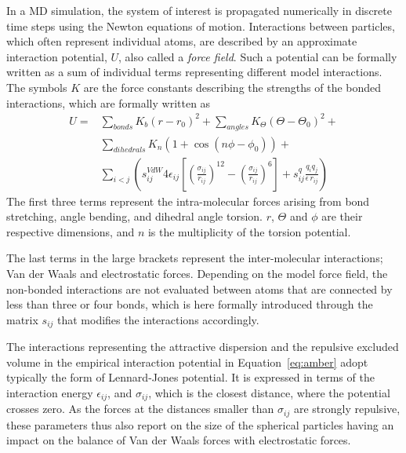 In a MD simulation, the system of interest is propagated numerically in discrete time steps using
the Newton equations of motion. 
Interactions between particles, which often represent individual atoms, 
are described by an approximate interaction potential, $U$, also called a \emph{force field}. 
Such a potential can be formally written as a sum of individual terms representing different model interactions.
The symbols $K$ are the force constants describing the strengths of the bonded interactions,
which are formally written as
\begin{eqnarray}  \label{eq:amber}
  U = & \displaystyle \sum _{bonds} K_b (r-r_{0})^2 + \sum _{angles} K_\Theta (\Theta-\Theta_{0})^2 + \\ \nonumber
      & \displaystyle \sum _{dihedrals} K_n (1+\cos(n\phi -\phi_0)) + \\ \nonumber
      & \displaystyle \sum _{i<j} \left ( s_{ij} ^{VdW} 4 \epsilon _{ij} \left [ \left (\frac{\sigma _{ij}}{r_{ij}} \right )^{12} - \left ( \frac{\sigma _{ij}}{r_{ij}} \right )^6 \right ] + s_{ij}^q \frac{q_i q_j}{\epsilon \, r_{ij}} \right )
\end{eqnarray}
The first three terms represent the intra-molecular forces arising from bond stretching, angle bending, and dihedral angle torsion. 
$r$, $\Theta$ and $\phi$ are their respective dimensions,
and $n$ is the multiplicity of the torsion potential. 

The last terms in the large brackets represent the inter-molecular interactions; 
 Van der Waals and electrostatic forces. 
Depending on the model force field, the non-bonded interactions 
are not evaluated between atoms that are connected by less than three or four bonds, 
which is here formally introduced through the matrix $s_{ij}$ that modifies the interactions accordingly.

The interactions representing the 
attractive dispersion and the repulsive excluded volume 
in the empirical interaction potential in Equation~\ref{eq:amber} 
adopt typically the form of Lennard-Jones potential. 
It is expressed in terms of the interaction energy $\epsilon_{ij}$, 
and $\sigma_{ij}$, 
which is the closest distance,
where the potential crosses zero. 
As the forces at the distances smaller than $\sigma _{ij}$ are strongly repulsive,
these parameters thus also report on the size of the spherical particles
having an impact on the balance of Van der Waals forces with electrostatic forces.


